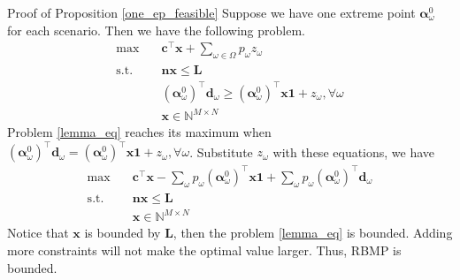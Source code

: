   \begin{pf}{Proof of Proposition \ref{one_ep_feasible}}
    Suppose we have one extreme point $\bm{\alpha}_{\omega}^{0}$ for each scenario. Then we have the following problem.
    \begin{equation}\label{lemma_eq}
      \begin{aligned}
        \max \quad & \mathbf{c}^{\intercal} \mathbf{x} + \sum_{\omega \in \Omega} p_{\omega} z_{\omega} \\
        \text {s.t.} \quad & \mathbf{n} \mathbf{x} \leq \mathbf{L} \\
        & (\bm{\alpha}_{\omega}^{0})^{\intercal}\mathbf{d}_{\omega} \geq (\bm{\alpha}_{\omega}^{0})^{\intercal} \mathbf{x} \mathbf{1} + z_{\omega}, \forall \omega \\
         & \mathbf{x} \in \mathbb{N}^{M \times N}
      \end{aligned}
    \end{equation}
    Problem \eqref{lemma_eq} reaches its maximum when $(\bm{\alpha}_{\omega}^{0})^{\intercal}\mathbf{d}_{\omega} = (\bm{\alpha}_{\omega}^{0})^{\intercal} \mathbf{x} \mathbf{1} + z_{\omega}, \forall \omega$. Substitute $z_{\omega}$ with these equations, we have 
    \begin{equation}\label{lemma_eq2}
      \begin{aligned}
        \max \quad & \mathbf{c}^{\intercal} \mathbf{x} - \sum_{\omega}p_{\omega}(\bm{\alpha}_{\omega}^{0})^{\intercal} \mathbf{x} \mathbf{1} + \sum_{\omega} p_{\omega} (\bm{\alpha}_{\omega}^{0})^{\intercal} \mathbf{d}_{\omega} \\
        \text {s.t.} \quad & \mathbf{n} \mathbf{x} \leq \mathbf{L} \\
        & \mathbf{x} \in \mathbb{N}^{M \times N}
      \end{aligned}
    \end{equation}
    Notice that $\mathbf{x}$ is bounded by $\mathbf{L}$, then the problem \eqref{lemma_eq} is bounded. Adding more constraints will not make the optimal value larger. Thus, RBMP is bounded. 
  \end{pf}
  


